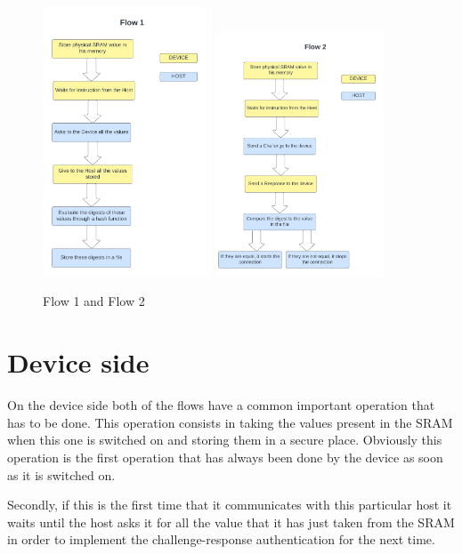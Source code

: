 \begin{figure}[H]
\centering
  \includegraphics[width=5cm]{images/flow_1.png}
  \includegraphics[width=5cm]{images/flow_2.png}
  \caption{Flow 1 and Flow 2}
  \label{fig:sub2}
\end{figure}

\section {Device side} 
On the device side both of the flows have a common important operation that has to be done. This operation consists in taking the values present in the SRAM when this one is switched on and storing them in a secure place. Obviously this operation is the first operation that has always been done by the device as soon as it is switched on.

Secondly, if this is the first time that it communicates with this particular host it waits until the host asks it for all the value that it has just taken from the SRAM in order to implement the challenge-response authentication for the next time.

